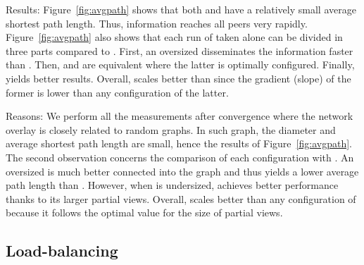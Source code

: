 \begin{asparadesc}
\item[Results:] Figure~\ref{fig:avgpath} shows that both \CYCLON and
  \SPRAY have a relatively small average shortest path length. Thus,
  information reaches all peers very rapidly. Figure~\ref{fig:avgpath}
  also shows that each run of \CYCLON taken alone can be divided in
  three parts compared to \SPRAY. First, an oversized \CYCLON
  disseminates the information faster than \SPRAY. Then, \SPRAY and
  \CYCLON are equivalent where the latter is optimally
  configured. Finally, \SPRAY yields better results. Overall, \SPRAY
  scales better than \CYCLON since the gradient (slope) of the former is lower
  than any configuration of the latter.
\item[Reasons:] We perform all the measurements after convergence
  where the network overlay is closely related to random graphs. In
  such graph, the diameter and average shortest path length are small,
  hence the results of Figure~\ref{fig:avgpath}. The second
  observation concerns the comparison of each \CYCLON configuration
  with \SPRAY.  An oversized \CYCLON is much better connected into the
  graph and thus yields a lower average path length than
  \SPRAY. However, when \CYCLON is undersized, \SPRAY achieves better
  performance thanks to its larger partial views. Overall, \SPRAY
  scales better than any configuration of \CYCLON because it follows
  the optimal value for the size of partial views.
\end{asparadesc}



\subsection{Load-balancing}

